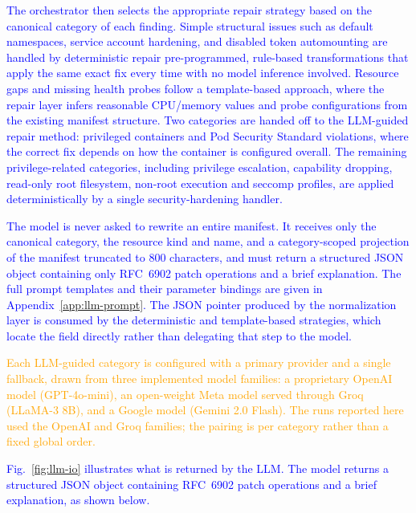 \documentclass[preprint,12pt]{elsarticle}
\newcommand{\new}[1]{\textcolor{blue}{#1}}
\newcommand{\fix}[1]{\textcolor{orange}{#1}}
\begin{document}
\new{
The orchestrator then selects the appropriate repair strategy based 
on the canonical category of each finding. Simple structural issues 
such as default namespaces, service account hardening, and disabled 
token automounting are handled by deterministic repair 
pre-programmed, rule-based transformations that apply the same 
exact fix every time with no model inference involved. Resource 
gaps and missing health probes follow a template-based approach, 
where the repair layer infers reasonable CPU/memory values and 
probe configurations from the existing manifest structure. Two categories are handed off to the LLM-guided repair method: privileged
containers and Pod Security Standard violations, where the correct fix depends
on how the container is configured overall. The remaining privilege-related
categories, including privilege escalation, capability dropping, read-only root
filesystem, non-root execution and seccomp profiles, are applied
deterministically by a single security-hardening handler.}

\new{The model is never asked to rewrite an entire manifest. It receives 
only the canonical category, the resource kind and name, and a 
category-scoped projection of the manifest truncated to 800 characters, 
and must return a structured JSON object containing only RFC~6902 patch 
operations and a brief explanation. The full prompt templates and their 
parameter bindings are given in Appendix~\ref{app:llm-prompt}. The JSON 
pointer produced by the normalization layer is consumed by the 
deterministic and template-based strategies, which locate the field 
directly rather than delegating that step to the model.}

\fix{Each LLM-guided category is configured with a primary provider and a
single fallback, drawn from three implemented model families: a proprietary
OpenAI model (GPT-4o-mini), an open-weight Meta model served through Groq
(LLaMA-3 8B), and a Google model (Gemini 2.0 Flash). The runs reported here
used the OpenAI and Groq families; the pairing is per category rather than a
fixed global order.}

\new{Fig.~\ref{fig:llm-io} illustrates what is returned by the LLM. The model returns a structured JSON object containing RFC~6902 patch operations 
and a brief explanation, as shown below.}
\end{document}
